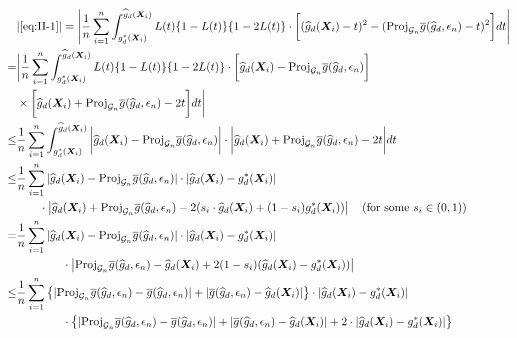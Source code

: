 \documentclass[11pt]{article}
\numberwithin{equation}{section}
\begin{document}
\begin{align*}
	&|\eqref{eq:II-1}|=\left|\frac{1}{n}\sum_{i=1}^n\int_{g_d^*(\boldsymbol{X}_i)}^{\widehat{g}_d(\boldsymbol{X}_i)}L(t)\{1-L(t)\}\{1-2L(t)\}\cdot\bigg[(\widehat{g}_d(\boldsymbol{X}_i)-t)^2-(\text{Proj}_{\mathcal{G}_n}\overline{g}(\widehat{g}_d,\epsilon_n)-t)^2\bigg]dt\right|\\
	=&\bigg|\frac{1}{n}\sum_{i=1}^n\int_{g_d^*(\boldsymbol{X}_i)}^{\widehat{g}_d(\boldsymbol{X}_i)}L(t)\{1-L(t)\}\{1-2L(t)\}\cdot\bigg[\widehat{g}_d(\boldsymbol{X}_i)-\text{Proj}_{\mathcal{G}_n}\overline{g}(\widehat{g}_d,\epsilon_n)\bigg]\\
	&\times \bigg[\widehat{g}_d(\boldsymbol{X}_i)+\text{Proj}_{\mathcal{G}_n}\overline{g}(\widehat{g}_d,\epsilon_n)-2t\bigg]dt\bigg|\\
	\leq & \frac{1}{n}\sum_{i=1}^n\int_{g_d^*(\boldsymbol{X}_i)}^{\widehat{g}_d(\boldsymbol{X}_i)}\bigg|\widehat{g}_d(\boldsymbol{X}_i)-\text{Proj}_{\mathcal{G}_n}\overline{g}(\widehat{g}_d,\epsilon_n)\bigg|\cdot \bigg|\widehat{g}_d(\boldsymbol{X}_i)+\text{Proj}_{\mathcal{G}_n}\overline{g}(\widehat{g}_d,\epsilon_n)-2t\bigg|dt\\
	\leq & \frac{1}{n}\sum_{i=1}^n|\widehat{g}_d(\boldsymbol{X}_i)-\text{Proj}_{\mathcal{G}_n}\overline{g}(\widehat{g}_d,\epsilon_n)|\cdot|\widehat{g}_d(\boldsymbol{X}_i)-g_d^*(\boldsymbol{X}_i)| \\
	&\qquad \cdot\left|\widehat{g}_d(\boldsymbol{X}_i)+\text{Proj}_{\mathcal{G}_n}\overline{g}(\widehat{g}_d,\epsilon_n)-2(s_i\cdot\widehat{g}_d(\boldsymbol{X}_i)+(1-s_i)g_d^*(\boldsymbol{X}_i))\right|\quad (\text{for some} \ s_i\in (0,1)) \\
	=&	  \frac{1}{n}\sum_{i=1}^n|\widehat{g}_d(\boldsymbol{X}_i)-\text{Proj}_{\mathcal{G}_n}\overline{g}(\widehat{g}_d,\epsilon_n)|\cdot|\widehat{g}_d(\boldsymbol{X}_i)-g_d^*(\boldsymbol{X}_i)| \\
	&\qquad\qquad \cdot\left|\text{Proj}_{\mathcal{G}_n}\overline{g}(\widehat{g}_d,\epsilon_n)-\widehat{g}_d(\boldsymbol{X}_i)+2(1-s_i)(\widehat{g}_d(\boldsymbol{X}_i)-g_d^*(\boldsymbol{X}_i))\right|\\
	\leq &		  \frac{1}{n}\sum_{i=1}^n\left\{|\text{Proj}_{\mathcal{G}_n}\overline{g}(\widehat{g}_d,\epsilon_n)-\overline{g}(\widehat{g}_d,\epsilon_n)|+|\overline{g}(\widehat{g}_d,\epsilon_n)-\widehat{g}_d(\boldsymbol{X}_i)|\right\}\cdot|\widehat{g}_d(\boldsymbol{X}_i)-g_d^*(\boldsymbol{X}_i)| \\
	&\qquad\qquad \cdot\left\{|\text{Proj}_{\mathcal{G}_n}\overline{g}(\widehat{g}_d,\epsilon_n)-\overline{g}(\widehat{g}_d,\epsilon_n)|+|\overline{g}(\widehat{g}_d,\epsilon_n)-\widehat{g}_d(\boldsymbol{X}_i)|+2\cdot|\widehat{g}_d(\boldsymbol{X}_i)-g_d^*(\boldsymbol{X}_i)|\right\}\\

\end{align*}
\end{document}
